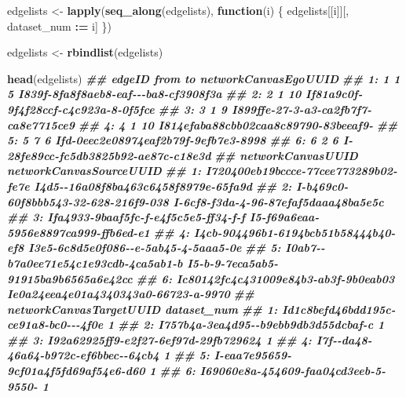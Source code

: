 \documentclass[
]{book}
\newenvironment{Shaded}{\begin{snugshade}}{\end{snugshade}}
\newcommand{\ControlFlowTok}[1]{\textcolor[rgb]{0.13,0.29,0.53}{\textbf{#1}}}
\newcommand{\DocumentationTok}[1]{\textcolor[rgb]{0.56,0.35,0.01}{\textbf{\textit{#1}}}}
\newcommand{\FunctionTok}[1]{\textcolor[rgb]{0.13,0.29,0.53}{\textbf{#1}}}
\newcommand{\NormalTok}[1]{#1}
\newcommand{\OtherTok}[1]{\textcolor[rgb]{0.56,0.35,0.01}{#1}}
\newcommand{\SpecialCharTok}[1]{\textcolor[rgb]{0.81,0.36,0.00}{\textbf{#1}}}
\begin{document}
\begin{Shaded}
\begin{Highlighting}[]
\NormalTok{edgelists }\OtherTok{\textless{}{-}} \FunctionTok{lapply}\NormalTok{(}\FunctionTok{seq\_along}\NormalTok{(edgelists), }\ControlFlowTok{function}\NormalTok{(i) \{}
\NormalTok{  edgelists[[i]][, dataset\_num }\SpecialCharTok{:=}\NormalTok{ i]}
\NormalTok{\})}

\NormalTok{edgelists }\OtherTok{\textless{}{-}} \FunctionTok{rbindlist}\NormalTok{(edgelists)}

\FunctionTok{head}\NormalTok{(edgelists)}
\DocumentationTok{\#\#    edgeID from to                 networkCanvasEgoUUID}
\DocumentationTok{\#\# 1:      1    1  5 I839f{-}8fa8f8aeb8{-}eaf{-}{-}{-}ba8{-}cf3908f3a}
\DocumentationTok{\#\# 2:      2    1 10 If81a9c0f{-}9f4f28ccf{-}c4c923a{-}8{-}0f5fce}
\DocumentationTok{\#\# 3:      3    1  9 I899ffe{-}27{-}3{-}a3{-}ca2fb7f7{-}ca8e7715ce9}
\DocumentationTok{\#\# 4:      4    1 10 I814efaba88cbb02caa8c89790{-}83beeaf9{-}}
\DocumentationTok{\#\# 5:      5    7  6 Ifd{-}0eec2e08974eaf2b79f{-}9efb7e3{-}8998}
\DocumentationTok{\#\# 6:      6    2  6 I{-}28fe89cc{-}fc5db3825b92{-}ae87c{-}c18e3d}
\DocumentationTok{\#\#                       networkCanvasUUID              networkCanvasSourceUUID}
\DocumentationTok{\#\# 1: I720400eb19bccce{-}77cee773289b02{-}fe7e I4d5{-}{-}16a08f8ba463c6458f8979e{-}65fa9d}
\DocumentationTok{\#\# 2: I{-}b469c0{-}60f8bbb543{-}32{-}628{-}216f9{-}038 I{-}6cf8{-}f3da{-}4{-}96{-}87efaf5daaa48ba5e5c}
\DocumentationTok{\#\# 3: Ifa4933{-}9baaf5fc{-}f{-}e4f5c5e5{-}ff34{-}f{-}f I5{-}f69a6eaa{-}5956e8897ca999{-}ffb6ed{-}e1}
\DocumentationTok{\#\# 4: I4cb{-}904496b1{-}6194bcb51b58444b40{-}ef8 I3e5{-}6c8d5e0f086{-}{-}e{-}5ab45{-}4{-}5aaa5{-}0e}
\DocumentationTok{\#\# 5: I0ab7{-}{-}b7a0ee71e54c1e93cdb{-}4ca5ab1{-}b I5{-}b{-}9{-}7eca5ab5{-}91915ba9b6565a6e42cc}
\DocumentationTok{\#\# 6: Ic80142fc4c431009e84b3{-}ab3f{-}9b0eab03 Ie0a24eea4e01a4340343a0{-}66723{-}a{-}9970}
\DocumentationTok{\#\#                 networkCanvasTargetUUID dataset\_num}
\DocumentationTok{\#\# 1: Id1c8befd46bdd195c{-}ce91a8{-}bc0{-}{-}{-}4f0e           1}
\DocumentationTok{\#\# 2: I757b4a{-}3ea4d95{-}{-}b9ebb9db3d55dcbaf{-}c           1}
\DocumentationTok{\#\# 3: I92a62925ff9{-}e2f27{-}6ef97d{-}29fb729624           1}
\DocumentationTok{\#\# 4: I7f{-}{-}da48{-}46a64{-}b972c{-}ef6bbec{-}{-}64cb4           1}
\DocumentationTok{\#\# 5: I{-}eaa7e95659{-}9cf01a4f5fd69af54e6{-}d60           1}
\DocumentationTok{\#\# 6: I69060e8a{-}454609{-}faa04cd3eeb{-}5{-}9550{-}           1}
\end{Highlighting}
\end{Shaded}
\end{document}
